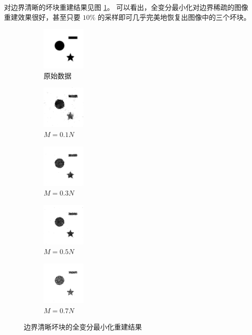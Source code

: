 对边界清晰的坏块重建结果见图 \ref{fig:TV2dsharp}。
可以看出，全变分最小化对边界稀疏的图像重建效果很好，甚至只要
$10\%$ 的采样即可几乎完美地恢复出图像中的三个坏块。

\begin{figure}
\centering
\begin{subfigure}[t]{1.1in}
	\includegraphics{Figure/testdata/2dsharp.png}
	\caption{原始数据}
\end{subfigure}
\begin{subfigure}[t]{1.1in}
	\includegraphics{Figure/TV/2dsharp10.png}
	\caption{$M = 0.1 N$}
\end{subfigure}
\begin{subfigure}[t]{1.1in}
	\includegraphics{Figure/TV/2dsharp30.png}
	\caption{$M = 0.3 N$}
\end{subfigure}
\begin{subfigure}[t]{1.1in}
	\includegraphics{Figure/TV/2dsharp50.png}
	\caption{$M = 0.5 N$}
\end{subfigure}
\begin{subfigure}[t]{1.1in}
	\includegraphics{Figure/TV/2dsharp70.png}
	\caption{$M = 0.7 N$}
\end{subfigure}
\caption{边界清晰坏块的全变分最小化重建结果}
\label{fig:TV2dsharp}
\end{figure}

